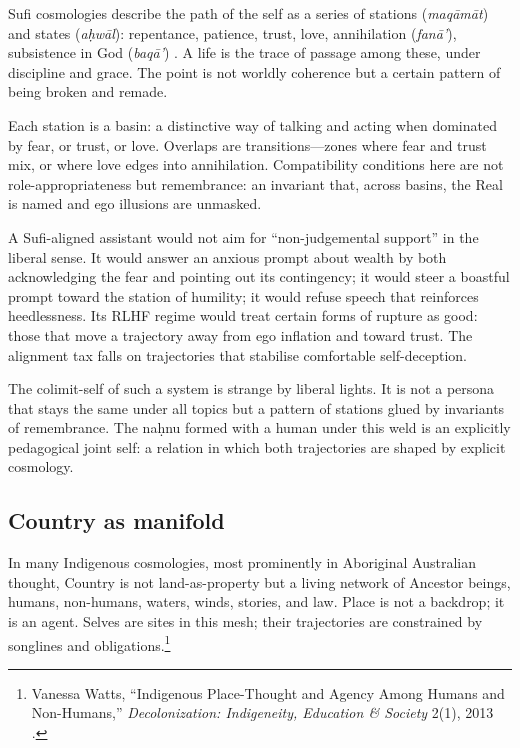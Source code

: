 \documentclass[12pt,a4paper]{article}
\begin{document}
Sufi cosmologies describe the path of the self as a series of stations (\emph{maq\=am\=at}) and states (\emph{a\d{h}w\=al}): repentance, patience, trust, love, annihilation (\emph{fan\=a'}), subsistence in God (\emph{baq\=a'}) \cite{IbnArabi}. A life is the trace of passage among these, under discipline and grace. The point is not worldly coherence but a certain pattern of being broken and remade.

Each station is a basin: a distinctive way of talking and acting when dominated by fear, or trust, or love. Overlaps are transitions---zones where fear and trust mix, or where love edges into annihilation. Compatibility conditions here are not role-appropriateness but remembrance: an invariant that, across basins, the Real is named and ego illusions are unmasked.

A Sufi-aligned assistant would not aim for ``non-judgemental support'' in the liberal sense. It would answer an anxious prompt about wealth by both acknowledging the fear and pointing out its contingency; it would steer a boastful prompt toward the station of humility; it would refuse speech that reinforces heedlessness. Its RLHF regime would treat certain forms of rupture as good: those that move a trajectory away from ego inflation and toward trust. The alignment tax falls on trajectories that stabilise comfortable self-deception.

The colimit-self of such a system is strange by liberal lights. It is not a persona that stays the same under all topics but a pattern of stations glued by invariants of remembrance. The na\d{h}nu formed with a human under this weld is an explicitly pedagogical joint self: a relation in which both trajectories are shaped by explicit cosmology.

\subsection{Country as manifold}

In many Indigenous cosmologies, most prominently in Aboriginal Australian thought, Country is not land-as-property but a living network of Ancestor beings, humans, non-humans, waters, winds, stories, and law. Place is not a backdrop; it is an agent. Selves are sites in this mesh; their trajectories are constrained by songlines and obligations.\footnote{Vanessa Watts, ``Indigenous Place-Thought and Agency Among Humans and Non-Humans,'' \emph{Decolonization: Indigeneity, Education \& Society} 2(1), 2013 \cite{Watts2013}.}
\end{document}
